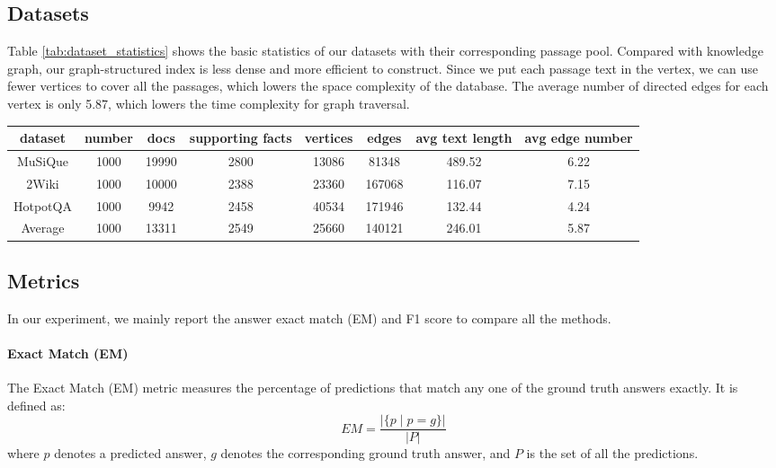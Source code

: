 \subsection{Datasets}
\label{dataset}
Table \ref{tab:dataset_statistics} shows the basic statistics of our datasets with their corresponding passage pool. Compared with knowledge graph, our graph-structured index is less dense and more efficient to construct. Since we put each passage text in the vertex, we can use fewer vertices to cover all the passages, which lowers the space complexity of the database. The average number of directed edges for each vertex is only 5.87, which lowers the time complexity for graph traversal. 
\begin{table*}[ht]
    \centering
    \setlength{\tabcolsep}{2pt}
    \begin{tabular}{cccccccc}
        \toprule
        dataset& number& docs &supporting facts& vertices& edges&  
avg text 
 length
& avg edge number\\
        \midrule
        MuSiQue & 1000 &   19990 &2800 &  13086 &  81348 
&  489.52 &  6.22 
\\
        2Wiki &  1000 &   10000 
&2388 &  23360 &  167068 
&  116.07 &  7.15 
\\
        HotpotQA & 1000 &   9942 
&2458 &  40534 &  171946 
&  132.44 &  4.24 
\\
        Average & 1000 &   13311 &2549 &  25660 &  140121 &  246.01 &  5.87 \\
        \bottomrule
    \end{tabular}
    \caption{Dataset Statistics. We report the basic statistics of the graph structure on different datasets and demonstrate that our efficient graph structure is traversal-friendly.}
    \label{tab:dataset_statistics}
\end{table*}
\subsection{Metrics}
\label{metric}

In our experiment, we mainly report the answer exact match (EM) and F1 score to compare all the methods.

     \paragraph{Exact Match (EM)} 
    The Exact Match (EM) metric measures the percentage of predictions that match any one of the ground truth answers exactly. It is defined as:
    \[
    EM = \frac{|\{ p \mid p = g \} |}{| P |}
    \]
    where \( p \) denotes a predicted answer, \( g \) denotes the corresponding ground truth answer, and \( P \) is the set of all the predictions.

